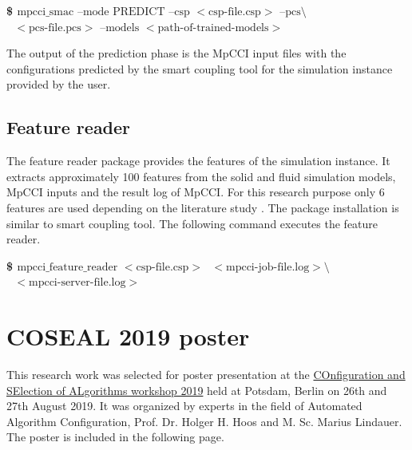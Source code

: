 \begin{enumerate}
\textbf{\$ $\text{mpcci\_smac --mode PREDICT --csp $<$csp-file.csp$>$ --pcs\textbackslash}$}
\newline
\textbf{ $\text{ $<$pcs-file.pcs$>$ --models $<$path-of-trained-models$>$}$}

The output of the prediction phase is the MpCCI input files with the configurations predicted by the smart coupling tool for the simulation instance provided by the user.

\end{enumerate}

\section{Feature reader}
\label{appendix:feature_reader}
The feature reader package provides the features of the simulation instance. It extracts approximately 100 features from the solid and fluid simulation models, MpCCI inputs and the result log of MpCCI. For this research purpose only 6 features are used depending on the literature study \cite{FSI_properties} \cite{FSI_properties2}. The package installation is similar to smart coupling tool. The following command executes the feature reader.

\noindent \textbf{\$ $\text{mpcci\_feature\_reader $<$csp-file.csp$>$ $<$mpcci-job-file.log$> $\textbackslash}$}
\newline
\textbf{$\text{ $<$mpcci-server-file.log$>$}$}

\chapter{COSEAL 2019 poster}
\label{chapter:coseal_poster}

This research work was selected for poster presentation at the \href{https://www.coseal.net/coseal-workshop-2019/}{COnfiguration and SElection of ALgorithms workshop 2019} held at Potsdam, Berlin on 26th and 27th August 2019. It was organized by experts in the field of Automated Algorithm Configuration, Prof. Dr. Holger H. Hoos and M. Sc. Marius Lindauer. The poster is included in the following page. 



